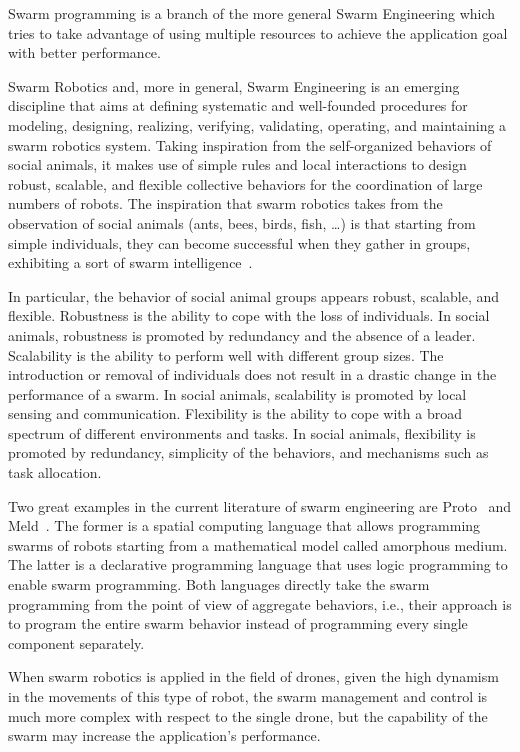 Swarm programming is a branch of the more general Swarm Engineering which tries to take advantage of using multiple resources to 
achieve the application goal with better performance.

Swarm Robotics and, more in general, Swarm Engineering is an emerging discipline that aims at defining systematic 
and well-founded procedures for modeling, designing, realizing, verifying, validating, operating, and maintaining 
a swarm robotics system. Taking inspiration from the self-organized behaviors of social animals, it makes use of simple 
rules and local interactions to design robust, scalable, and flexible collective behaviors for the coordination of large numbers of robots.
The inspiration that swarm robotics takes from the observation of social animals (ants, bees, birds, fish, …) is that starting from simple individuals,
they can become successful when they gather in groups, exhibiting a sort of swarm intelligence~\cite{bonabeau1999swarm}.

In particular, the behavior of social animal groups appears robust, scalable, and flexible. 
Robustness is the ability to cope with the loss of individuals. 
In social animals, robustness is promoted by redundancy and the absence of a leader. 
Scalability is the ability to perform well with different group sizes. 
The introduction or removal of individuals does not result in a drastic change in the performance of a swarm. 
In social animals, scalability is promoted by local sensing and communication. 
Flexibility is the ability to cope with a broad spectrum of different environments and tasks. 
In social animals, flexibility is promoted by redundancy, simplicity of the behaviors, and mechanisms such as task allocation.

Two great examples in the current literature of swarm engineering are Proto~\cite{bachrach2010proto} and Meld~\cite{ashley2007meld}. 
The former is a spatial computing language that allows programming swarms of robots starting from a mathematical model called amorphous medium.
The latter is a declarative programming language that uses logic programming to enable swarm programming.
Both languages directly take the swarm programming from the point of view of aggregate behaviors, i.e., their approach is to program the entire
swarm behavior instead of programming every single component separately.

When swarm robotics is applied in the field of drones, given the high dynamism in the movements of this type of robot, 
the swarm management and control is much more complex with respect to the single drone, 
but the capability of the swarm may increase the application's performance.


